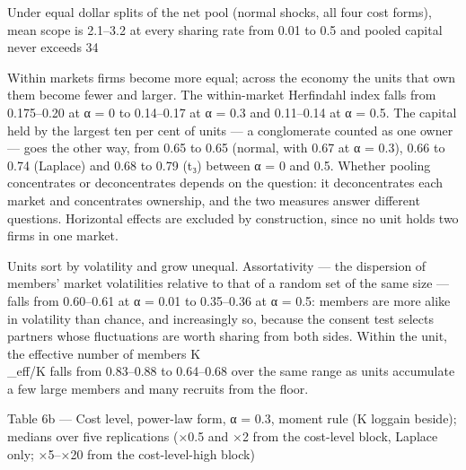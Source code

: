 Under equal dollar splits of the net pool (normal shocks, all four cost forms), mean scope is 2.1–3.2 at every sharing rate from 0.01 to 0.5 and pooled capital never exceeds 34%

Within markets firms become more equal; across the economy the units that own them become fewer and larger. The within-market Herfindahl index falls from 0.175–0.20 at α = 0 to 0.14–0.17 at α = 0.3 and 0.11–0.14 at α = 0.5. The capital held by the largest ten per cent of units — a conglomerate counted as one owner — goes the other way, from 0.65 to 0.65 (normal, with 0.67 at α = 0.3), 0.66 to 0.74 (Laplace) and 0.68 to 0.79 (t₃) between α = 0 and 0.5. Whether pooling concentrates or deconcentrates depends on the question: it deconcentrates each market and concentrates ownership, and the two measures answer different questions. Horizontal effects are excluded by construction, since no unit holds two firms in one market.

Units sort by volatility and grow unequal. Assortativity — the dispersion of members' market volatilities relative to that of a random set of the same size — falls from 0.60–0.61 at α = 0.01 to 0.35–0.36 at α = 0.5: members are more alike in volatility than chance, and increasingly so, because the consent test selects partners whose fluctuations are worth sharing from both sides. Within the unit, the effective number of members K\\_eff/K falls from 0.83–0.88 to 0.64–0.68 over the same range as units accumulate a few large members and many recruits from the floor.

Table 6b — Cost level, power-law form, α = 0.3, moment rule (K loggain beside); medians over five replications (×0.5 and ×2 from the cost-level block, Laplace only; ×5–×20 from the cost-level-high block)

